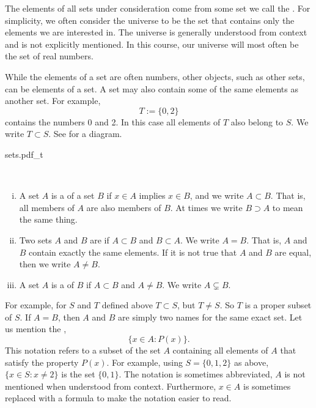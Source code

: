 The elements of all sets under consideration come from some set we call the
\emph{}.  For simplicity,
we often consider the universe to be the set that contains only the elements
we are interested in.
The universe is generally understood from context
and is not explicitly mentioned.  In this course, our universe will
most often be the set of real numbers.

While the elements of a set are often numbers,
other objects, such as other sets, can be elements of a set.
A set may also contain some of the same elements as another set.  For example,
\begin{equation*}
T := \{ 0, 2 \}
\end{equation*}
contains the numbers 0 and 2.  In this case all elements of $T$ also
belong to $S$.  We write $T \subset S$.
See  for a diagram.

\begin{myfigureht}
{sets.pdf_t}
\caption{A diagram of the example sets $S$ and its subset $T$.\label{fig:sets}}
\end{myfigureht}

\pagebreak[2]
\begin{defn}
{\ }
\begin{enumerate}[(i)]
\item
A set $A$ is a \emph{}
of a set $B$ if $x \in A$ implies $x \in B$, and we write $A \subset B$.
That is, all members of $A$ are also members of $B$.  At times we
write $B \supset A$ to mean the same thing.
\item
Two sets $A$ and $B$ are \emph{} if $A \subset B$ and $B
\subset A$.  We write $A = B$.
That is, $A$ and $B$ contain exactly the same elements.
If it is not true that $A$ and $B$ are equal, then 
we write $A \not= B$.
\item
A set $A$ is a \emph{} of $B$ if $A \subset B$
and $A \not= B$.  We write $A \subsetneq B$.
\end{enumerate}
\end{defn}

For example, for $S$ and $T$ defined above $T \subset S$, but
$T \not= S$.  So $T$ is a proper subset of $S$.
If $A = B$, then $A$ and $B$ are simply two names for the
same exact set.
Let us mention the
\emph{},
\begin{equation*}
\bigl\{ x \in A : P(x) \bigr\} .
\end{equation*}
This notation refers to a subset of the set $A$ containing all elements
of $A$ that satisfy the property $P(x)$.
For example, using $S = \{ 0, 1, 2 \}$ as above, $\{ x \in S : x \not= 2 \}$
is the set $\{ 0, 1 \}$.
The notation is sometimes
abbreviated, $A$ is not mentioned when understood from context.
Furthermore, $x \in A$ is sometimes replaced with a formula to make the notation
easier to read.  

